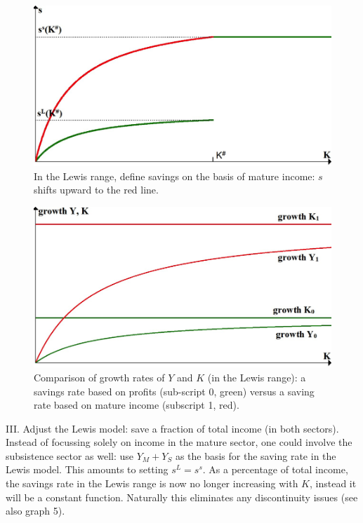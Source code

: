 \documentclass[a4paper]{article}
\begin{document}
\begin{figure}
\includegraphics[width=\linewidth]{graph3.png}
\caption{\label{fig:Graph 3}In the Lewis range, define savings on the basis of mature income: $s$ shifts upward to the red line.}
\end{figure}

\begin{figure}
\includegraphics[width=\linewidth]{graph4.png}
\caption{\label{fig:Graph 4}Comparison of growth rates of $Y$ and $K$ (in the Lewis range): a savings rate based on profits (sub-script 0, green) versus a saving rate based on mature income (subscript 1, red).}
\end{figure}

III. Adjust the Lewis model: save a fraction of total income (in both sectors).
Instead of focussing solely on income in the mature sector, one could involve the subsistence sector as well: use $Y_M+Y_S$ as the basis for the saving rate in the Lewis model. This amounts to setting $s^L= s^s$.   As a percentage of total income, the savings rate in the Lewis range is now no longer increasing with $K$, instead it will be a constant function. Naturally this eliminates any discontinuity issues (see also graph 5). 
 
\end{document}
